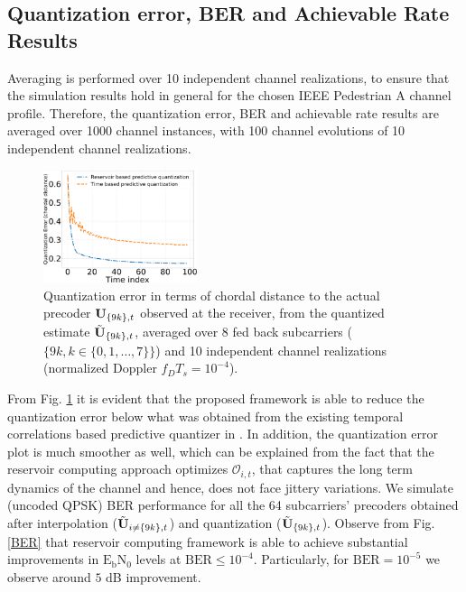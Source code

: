 \documentclass[conference]{IEEEtran}
\begin{document}
\subsection{Quantization error, BER and Achievable Rate Results}
\label{res}{}
\noindent Averaging is performed over 10 independent channel realizations, to ensure that the simulation results hold in general for the chosen IEEE Pedestrian A channel profile. Therefore, the quantization error, BER and achievable rate results are averaged over 1000 channel instances, with 100 channel evolutions of 10 independent channel realizations.
\begin{figure}
\centering
\includegraphics[width=0.4\textwidth]{images/qtizErr.pdf}
\caption{Quantization error in terms of chordal distance to the actual precoder ${\bf U}_{\{9k\},t}$ observed at the receiver, from the quantized estimate $\tilde{{\bf U}}_{\{9k\},t}$, averaged over 8 fed back subcarriers ($\{9k, k \in \{0,1,\ldots,7\}\}$) and 10 independent channel realizations (normalized Doppler $f_DT_s=10^{-4}$).}
\label{qtiz_err}
\vspace{-10pt}
\end{figure}

From Fig. \ref{qtiz_err} it is evident that the proposed framework is able to reduce the quantization error below what was obtained from the existing temporal correlations based predictive quantizer in \cite{6891198}. In addition, the quantization error plot is much smoother as well, which can be explained from the fact that the reservoir computing approach optimizes $\mathcal{O}_{i,t}$, that captures the long term dynamics of the channel and hence, does not face jittery variations. We simulate (uncoded QPSK) BER performance for all the 64 subcarriers' precoders obtained after interpolation ($\tilde{{\bf U}}_{i\neq\{9k\},t}$) and quantization ($\tilde{{\bf U}}_{\{9k\},t}$). Observe from Fig. \ref{BER} that reservoir computing framework is able to achieve substantial improvements in $\text{E}_\text{b}\text{N}_0$ levels at $\text{BER}\leq 10^{-4}$. Particularly, for $\text{BER}=10^{-5}$ we observe around $5$ dB improvement. 
\end{document}
